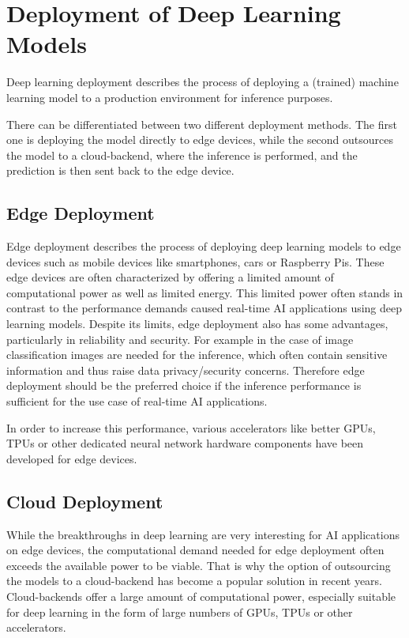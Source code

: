 \section{Deployment of Deep Learning Models}
Deep learning deployment describes the process of deploying a (trained) machine learning model to a production environment for inference purposes. 

There can be differentiated between two different deployment methods. The first one is deploying the model directly to edge devices, while the second outsources the model to a cloud-backend, where the inference is performed, and the prediction is then sent back to the edge device.
\subsection{Edge Deployment}
Edge deployment describes the process of deploying deep learning models to edge devices such as mobile devices like smartphones, cars or Raspberry Pis.
These edge devices are often characterized by offering a limited amount of computational power as well as limited energy.
This limited power often stands in contrast to the performance demands caused real-time AI applications using deep learning models.
Despite its limits, edge deployment also has some advantages, particularly in reliability and security. 
For example in the case of image classification images are needed for the inference, which often contain sensitive information and thus raise data privacy/security concerns.
Therefore edge deployment should be the preferred choice if the inference performance is sufficient for the use case of real-time AI applications.

In order to increase this performance, various accelerators like better GPUs, TPUs or other dedicated neural network hardware components have been developed for edge devices.



\subsection{Cloud Deployment}
While the breakthroughs in deep learning are very interesting for AI applications on edge devices, the computational demand needed for edge deployment often exceeds the available power to be viable.
That is why the option of outsourcing the models to a cloud-backend has become a popular solution in recent years.
Cloud-backends offer a large amount of computational power, especially suitable for deep learning in the form of large numbers of GPUs, TPUs or other accelerators.

